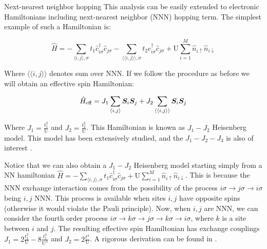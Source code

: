 \begin{subsection}{Next-nearest neighbor hopping}
This analysis can be easily extended to electronic Hamiltonians including next-nearest neighbor (NNN) hopping term. The simplest example of such a Hamiltonian is:

\begin{equation}
\hat{H} = -\sum_{\langle i,j \rangle, \sigma}t_{1}\hat{c}_{i \sigma}^\dagger \hat{c}_{j \sigma} -\sum_{\langle \langle i,j \rangle \rangle, \sigma} t_{2}\hat{c}_{i \sigma}^\dagger \hat{c}_{j \sigma} + \text{U} \sum_{i=1}^M \hat{n}_{i\uparrow}\hat{n}_{i\downarrow}
\end{equation}

Where $\langle \langle i,j \rangle \rangle$ denotes sum over NNN. If we follow the procedure as before we will obtain an effective spin Hamiltonian:

\begin{equation}
\hat{H}_{\text{eff}} = J_1\sum_{\langle i,j \rangle} \boldsymbol{S}_i\boldsymbol{S}_j + J_2\sum_{\langle \langle i,j \rangle \rangle}\boldsymbol{S}_i\boldsymbol{S}_j
\end{equation}

Where $J_1 = \frac{t_1^2}{\text{U}}$ and $J_2 = \frac{t_2^2}{\text{U}}$. This Hamiltonian is known as $J_1-J_2$ Heisenberg model. This model has been extensively studied, and the $J_1-J_2-J_3$ is also of interest \cite{Reuther2011}. 

Notice that we can also obtain a $J_1-J_2$ Heisenberg model starting simply from a NN hamiltonian $\hat{H} = -\sum_{\langle i,j \rangle, \sigma}t_{1}\hat{c}_{i \sigma}^\dagger \hat{c}_{j \sigma} + \text{U} \sum_{i=1}^M \hat{n}_{i\uparrow}\hat{n}_{i\downarrow}$. This is because the NNN exchange interaction comes from the possibility of the process $i\sigma \rightarrow j\sigma \rightarrow i\sigma$ being $i,j$ NNN. This process is available when sites $i, j$ have opposite spins (otherwise it would violate the Pauli principle). Now, when $i,j$ are NNN, we can consider the fourth order process $i\sigma \rightarrow k\sigma \rightarrow j\sigma \rightarrow k\sigma \rightarrow i\sigma$, where $k$ is a site between $i$ and $j$. The resulting effective spin Hamiltonian has exchange couplings $J_1 = 2\frac{t_1^2}{\text{U}} - 8 \frac{t_1^4}{\text{U}^3}$ and $J_2 = 2\frac{t^4}{\text{U}}$. A rigorous derivation can be found in \cite{MacDonald1988}. 

\end{subsection}

